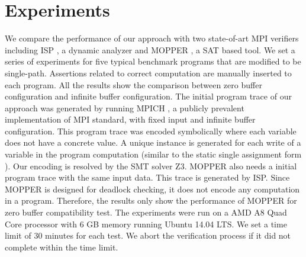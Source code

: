 \section{Experiments}
We compare the performance of our approach with two state-of-art MPI verifiers including ISP \cite{DBLP:conf/ppopp/VakkalankaSGK08,DBLP:conf/sbmf/SharmaGB12}, a dynamic analyzer and MOPPER \cite{DBLP:conf/fm/ForejtKNS14}, a SAT based tool. 
We set a series of experiments for five typical benchmark programs that are modified to be single-path. Assertions related to correct computation are manually inserted to each program. All the results show the comparison between zero buffer configuration and infinite buffer configuration. The initial program trace of our approach was generated by running MPICH \cite{mpich}, a publicly prevalent implementation of MPI standard, with fixed input and infinite buffer configuration. This program trace was encoded symbolically where each variable does not have a concrete value. A unique instance is generated for each write of a variable in the program computation (similar to the static single assignment form \cite{DBLP:journals/toplas/CytronFRWZ91}). Our encoding is resolved by the SMT solver Z3. MOPPER also needs a initial program trace with the same input data. This trace is generated by ISP. Since MOPPER is designed for deadlock checking, it does not encode any computation in a program. Therefore, the results only show the performance of MOPPER for zero buffer compatibility test. The experiments were run on a AMD A8 Quad Core processor with 6 GB memory running Ubuntu 14.04 LTS. We set a time limit of 30 minutes for each test. We abort the verification process if it did not complete within the time limit. 


